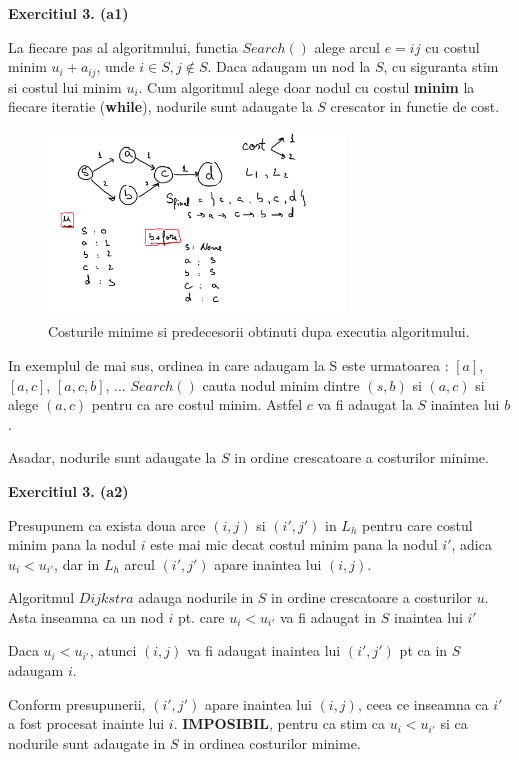 \documentclass{article}
\begin{document}
 

\textbf{Exercitiul 3. (a1) }

La fiecare pas al algoritmului, functia $Search()$ alege arcul $e = ij$ cu costul minim $u_i + a_{ij}$, unde $i \in S,j \notin S$. Daca adaugam un nod la $S$, cu siguranta stim si costul lui minim $u_i$. Cum algoritmul alege doar nodul cu costul \textbf{minim} la fiecare iteratie (\textbf{while}), nodurile sunt adaugate la $S$ crescator in functie de cost.

\begin{figure}[h!]
  \centering
  \renewcommand{\thefigure}{}
  \includegraphics[width=0.7\textwidth]{example_digraf.jpg}
  \caption{Costurile minime si predecesorii obtinuti dupa executia algoritmului.}
  \label{fig:my_image}
\end{figure}

In exemplul de mai sus, ordinea in care adaugam la S este urmatoarea : $[a]$, $[a, c]$, $[a, c, b]$, ... $Search()$ cauta nodul minim dintre $(s, b)$ si $(a, c)$ si alege $(a, c)$ pentru ca are costul minim. Astfel $c$ va fi adaugat la $S$ inaintea lui $b$.

Asadar, nodurile sunt adaugate la $S$ in ordine crescatoare a costurilor minime.

\textbf{Exercitiul 3. (a2) }

Presupunem ca exista doua arce $(i,j)$ si $(i',j')$ in $L_h$ pentru care costul minim pana la nodul $i$ este mai mic decat costul minim pana la nodul $i'$, adica $u_i < u_{i'}$, dar in $L_h$ arcul $(i',j')$ apare inaintea lui $(i,j)$.

Algoritmul $Dijkstra$ adauga nodurile in $S$ in ordine crescatoare a costurilor $u$. Asta inseamna ca un nod $i$ pt. care $u_i < u_{i'}$ va fi adaugat in $S$ inaintea lui $i'$

Daca $u_i < u_{i'}$, atunci $(i,j)$ va fi adaugat inaintea lui $(i',j')$ pt ca in $S$ adaugam $i$.

Conform presupunerii, $(i',j')$ apare inaintea lui $(i,j)$, ceea ce inseamna ca $i'$ a fost procesat inainte lui $i$. \textbf{IMPOSIBIL}, pentru ca stim ca $u_i < u_{i'}$ si ca nodurile sunt adaugate in $S$ in ordinea costurilor minime. 
\end{document}
